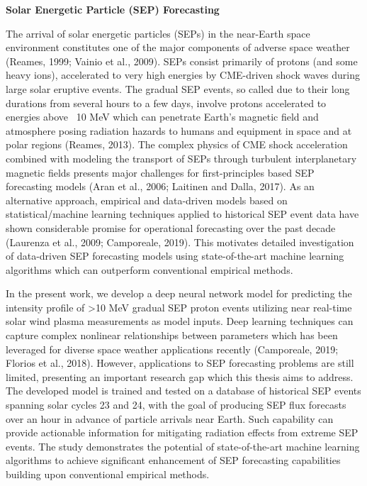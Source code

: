 \documentclass{article}
\begin{document}
\textbf{Solar Energetic Particle (SEP) Forecasting}

The arrival of solar energetic particles (SEPs) in the near-Earth space environment constitutes one of the major components of adverse space weather (Reames, 1999; Vainio et al., 2009). SEPs consist primarily of protons (and some heavy ions), accelerated to very high energies by CME-driven shock waves during large solar eruptive events. The gradual SEP events, so called due to their long durations from several hours to a few days, involve protons accelerated to energies above ~10 MeV which can penetrate Earth’s magnetic field and atmosphere posing radiation hazards to humans and equipment in space and at polar regions (Reames, 2013). The complex physics of CME shock acceleration combined with modeling the transport of SEPs through turbulent interplanetary magnetic fields presents major challenges for first-principles based SEP forecasting models (Aran et al., 2006; Laitinen and Dalla, 2017). As an alternative approach, empirical and data-driven models based on statistical/machine learning techniques applied to historical SEP event data have shown considerable promise for operational forecasting over the past decade (Laurenza et al., 2009; Camporeale, 2019). This motivates detailed investigation of data-driven SEP forecasting models using state-of-the-art machine learning algorithms which can outperform conventional empirical methods.

In the present work, we develop a deep neural network model for predicting the intensity profile of >10 MeV gradual SEP proton events utilizing near real-time solar wind plasma measurements as model inputs. Deep learning techniques can capture complex nonlinear relationships between parameters which has been leveraged for diverse space weather applications recently (Camporeale, 2019; Florios et al., 2018). However, applications to SEP forecasting problems are still limited, presenting an important research gap which this thesis aims to address. The developed model is trained and tested on a database of historical SEP events spanning solar cycles 23 and 24, with the goal of producing SEP flux forecasts over an hour in advance of particle arrivals near Earth. Such capability can provide actionable information for mitigating radiation effects from extreme SEP events. The study demonstrates the potential of state-of-the-art machine learning algorithms to achieve significant enhancement of SEP forecasting capabilities building upon conventional empirical methods.
\end{document}
